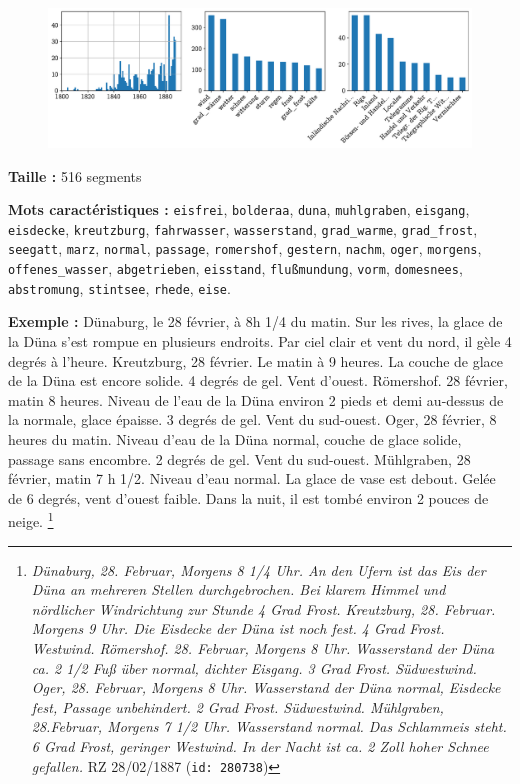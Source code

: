 \documentclass[a4paper,twoside,12pt]{article}
\begin{document}
\begin{figure}[H]
\centering
\includegraphics[width=\textwidth]{images/topic_charts_14.pdf}
\end{figure}

\begin{flushleft}
\textbf{Taille :} 516 segments

\textbf{Mots caractéristiques :} \texttt{eisfrei}, \texttt{bolderaa}, \texttt{duna}, \texttt{muhlgraben}, \texttt{eisgang}, \texttt{eisdecke}, \texttt{kreutzburg}, \texttt{fahrwasser}, \texttt{wasserstand}, \texttt{grad\_warme}, \texttt{grad\_frost}, \texttt{seegatt}, \texttt{marz}, \texttt{normal}, \texttt{passage}, \texttt{romershof}, \texttt{gestern}, \texttt{nachm}, \texttt{oger}, \texttt{morgens}, \texttt{offenes\_wasser}, \texttt{abgetrieben}, \texttt{eisstand}, \texttt{flußmundung}, \texttt{vorm}, \texttt{domesnees}, \texttt{abstromung}, \texttt{stintsee}, \texttt{rhede}, \texttt{eise}.
\end{flushleft}

\medskip

\noindent \textbf{Exemple :} \og Dünaburg, le 28 février, à 8h 1/4 du matin. Sur les rives, la glace de la Düna s'est rompue en plusieurs endroits. Par ciel clair et vent du nord, il gèle 4 degrés à l'heure. Kreutzburg, 28 février. Le matin à 9 heures. La couche de glace de la Düna est encore solide. 4 degrés de gel. Vent d'ouest.
Römershof. 28 février, matin 8 heures. Niveau de l'eau de la Düna environ 2 pieds et demi au-dessus de la normale, glace épaisse. 3 degrés de gel. Vent du sud-ouest. Oger, 28 février, 8 heures du matin. Niveau d'eau de la Düna normal, couche de glace solide, passage sans encombre. 2 degrés de gel. Vent du sud-ouest. Mühlgraben, 28 février, matin 7 h 1/2. Niveau d'eau normal. La glace de vase est debout. Gelée de 6 degrés, vent d'ouest faible. Dans la nuit, il est tombé environ 2 pouces de neige. \fg{}\footnote{\textit{Dünaburg, 28. Februar, Morgens 8 1/4 Uhr. An den Ufern ist das Eis der Düna an mehreren Stellen durchgebrochen. Bei klarem Himmel und nördlicher Windrichtung zur Stunde 4 Grad Frost.
Kreutzburg, 28. Februar. Morgens 9 Uhr. Die Eisdecke der Düna ist noch fest. 4 Grad Frost. Westwind. Römershof. 28. Februar, Morgens 8 Uhr. Wasserstand der Düna ca. 2 1/2 Fuß über normal, dichter Eisgang. 3 Grad Frost. Südwestwind. Oger, 28. Februar, Morgens 8 Uhr. Wasserstand der Düna normal, Eisdecke fest, Passage unbehindert. 2 Grad Frost. Südwestwind. Mühlgraben, 28.Februar, Morgens 7 1/2 Uhr. Wasserstand normal. Das Schlammeis steht. 6 Grad Frost, geringer Westwind. In der Nacht ist ca. 2 Zoll hoher Schnee gefallen.} RZ 28/02/1887 (\texttt{id: 280738})}
\end{document}
